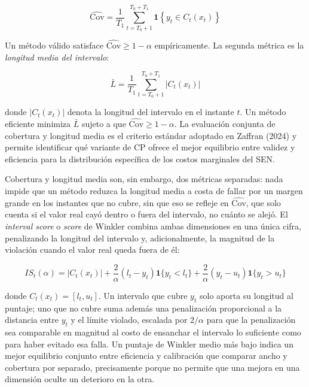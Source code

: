 \begin{equation}
    \widehat{\text{Cov}} = \frac{1}{T_1} \sum_{t=T_0+1}^{T_0+T_1} \mathbf{1}\!\left\{y_t \in C_t(x_t)\right\}
    \label{eq:empirical_coverage}
\end{equation}

Un método válido satisface $\widehat{\text{Cov}} \geq 1 - \alpha$ empíricamente. La segunda métrica es la \textit{longitud media del intervalo}:

\begin{equation}
    \bar{L} = \frac{1}{T_1} \sum_{t=T_0+1}^{T_0+T_1} \left|C_t(x_t)\right|
    \label{eq:mean_length}
\end{equation}

donde $|C_t(x_t)|$ denota la longitud del intervalo en el instante $t$. Un método eficiente minimiza $\bar{L}$ sujeto a que $\widehat{\text{Cov}} \geq 1 - \alpha$. La evaluación conjunta de cobertura y longitud media es el criterio estándar adoptado en Zaffran (2024) y permite identificar qué variante de CP ofrece el mejor equilibrio entre validez y eficiencia para la distribución específica de los costos marginales del SEN.

Cobertura y longitud media son, sin embargo, dos métricas separadas: nada impide que un método reduzca la longitud media a costa de fallar por un margen grande en los instantes que no cubre, sin que eso se refleje en $\widehat{\text{Cov}}$, que solo cuenta si el valor real cayó dentro o fuera del intervalo, no cuánto se alejó. El \textit{interval score} o \textit{score} de Winkler \cite{Winkler1972} combina ambas dimensiones en una única cifra, penalizando la longitud del intervalo y, adicionalmente, la magnitud de la violación cuando el valor real queda fuera de él:

\begin{equation}
    IS_t(\alpha) = \left|C_t(x_t)\right| + \frac{2}{\alpha}\left(l_t - y_t\right)\mathbf{1}\{y_t < l_t\} + \frac{2}{\alpha}\left(y_t - u_t\right)\mathbf{1}\{y_t > u_t\}
    \label{eq:winkler_score}
\end{equation}

donde $C_t(x_t) = [l_t, u_t]$. Un intervalo que cubre $y_t$ solo aporta su longitud al puntaje; uno que no cubre suma además una penalización proporcional a la distancia entre $y_t$ y el límite violado, escalada por $2/\alpha$ para que la penalización sea comparable en magnitud al costo de ensanchar el intervalo lo suficiente como para haber evitado esa falla. Un puntaje de Winkler medio más bajo indica un mejor equilibrio conjunto entre eficiencia y calibración que comparar ancho y cobertura por separado, precisamente porque no permite que una mejora en una dimensión oculte un deterioro en la otra.

